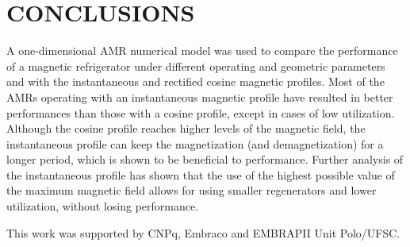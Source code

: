 \documentclass[draft]{svjour3}
\begin{document}
\section{CONCLUSIONS}
\label{sec:conclusions}

A one-dimensional AMR numerical model was used to compare the performance of a magnetic refrigerator under different operating and geometric parameters and with the instantaneous and rectified cosine magnetic profiles. Most of the AMRs operating with an instantaneous magnetic profile have resulted in better performances than those with a cosine profile, except in cases of low utilization. Although the cosine profile reaches higher levels of the magnetic field, the instantaneous profile can keep the magnetization (and demagnetization) for a longer period, which is shown to be beneficial to performance. Further analysis of the instantaneous profile has shown that the use of the highest possible value of the maximum magnetic field allows for using smaller regenerators and lower utilization, without losing performance.

\begin{acknowledgements}
This work was supported by CNPq, Embraco and EMBRAPII Unit Polo/UFSC.  
\end{acknowledgements}



\end{document}
